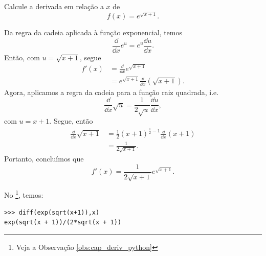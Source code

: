 \begin{exeresol}
  Calcule a derivada em relação a $x$ de
  \begin{equation}
    f(x) = e^{\sqrt{x+1}}.
  \end{equation}
\end{exeresol}
\begin{resol}
  Da regra da cadeia aplicada à função exponencial, temos
  \begin{equation}
    \frac{\dd}{\dd x}e^u = e^u\frac{\dd u}{\dd x}.
  \end{equation}
  Então, com $u = \sqrt{x+1}$, segue
  \begin{align}
    f'(x) &= \frac{\dd}{\dd x}e^{\sqrt{x+1}} \\
          &= e^{\sqrt{x+1}}\frac{\dd}{\dd x}\left(\sqrt{x+1}\right).
  \end{align}
  Agora, aplicamos a regra da cadeia para a função raiz quadrada, i.e.
  \begin{equation}
    \frac{\dd}{\dd x}\sqrt{u} = \frac{1}{2\sqrt{u}}\frac{\dd u}{\dd x},
  \end{equation}
  com $u = x+1$. Segue, então
  \begin{align}
    \frac{\dd}{\dd x}\sqrt{x+1} &= \frac{1}{2}(x+1)^{\frac{1}{2}-1}\frac{\dd}{\dd x}(x+1) \\
                                &= \frac{1}{2\sqrt{x+1}}.
  \end{align}
  Portanto, concluímos que
  \begin{equation}
    f'(x) = \frac{1}{2\sqrt{x+1}}e^{\sqrt{x+1}}.
  \end{equation}

  \ifispython
  No \sympy\footnote{Veja a Observação \ref{obs:cap_deriv_python}}, temos:
\begin{verbatim}
>>> diff(exp(sqrt(x+1)),x)
exp(sqrt(x + 1))/(2*sqrt(x + 1))
\end{verbatim}
  \fi  
\end{resol}

